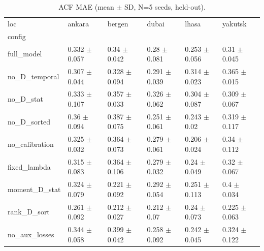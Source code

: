\begin{table}
\caption{ACF MAE (mean $\pm$ SD, N=5 seeds, held-out).}
\label{tab:acf_mae_v2}
\begin{tabular}{llllll}
\toprule
loc & ankara & bergen & dubai & lhasa & yakutsk \\
config &  &  &  &  &  \\
\midrule
full\_model & 0.332 $\pm$ 0.057 & 0.34 $\pm$ 0.042 & 0.28 $\pm$ 0.081 & 0.253 $\pm$ 0.056 & 0.31 $\pm$ 0.045 \\
no\_D\_temporal & 0.307 $\pm$ 0.044 & 0.328 $\pm$ 0.094 & 0.291 $\pm$ 0.039 & 0.314 $\pm$ 0.023 & 0.365 $\pm$ 0.015 \\
no\_D\_stat & 0.333 $\pm$ 0.107 & 0.357 $\pm$ 0.033 & 0.326 $\pm$ 0.062 & 0.304 $\pm$ 0.087 & 0.309 $\pm$ 0.067 \\
no\_D\_sorted & 0.36 $\pm$ 0.094 & 0.387 $\pm$ 0.075 & 0.251 $\pm$ 0.061 & 0.243 $\pm$ 0.02 & 0.319 $\pm$ 0.117 \\
no\_calibration & 0.325 $\pm$ 0.032 & 0.364 $\pm$ 0.073 & 0.279 $\pm$ 0.061 & 0.206 $\pm$ 0.024 & 0.34 $\pm$ 0.112 \\
fixed\_lambda & 0.315 $\pm$ 0.083 & 0.364 $\pm$ 0.106 & 0.279 $\pm$ 0.032 & 0.24 $\pm$ 0.049 & 0.32 $\pm$ 0.067 \\
moment\_D\_stat & 0.324 $\pm$ 0.079 & 0.221 $\pm$ 0.092 & 0.292 $\pm$ 0.054 & 0.251 $\pm$ 0.113 & 0.4 $\pm$ 0.034 \\
rank\_D\_sort & 0.261 $\pm$ 0.092 & 0.212 $\pm$ 0.027 & 0.212 $\pm$ 0.07 & 0.24 $\pm$ 0.073 & 0.225 $\pm$ 0.063 \\
no\_aux\_losses & 0.344 $\pm$ 0.058 & 0.399 $\pm$ 0.042 & 0.258 $\pm$ 0.092 & 0.242 $\pm$ 0.045 & 0.324 $\pm$ 0.122 \\
\bottomrule
\end{tabular}
\end{table}


